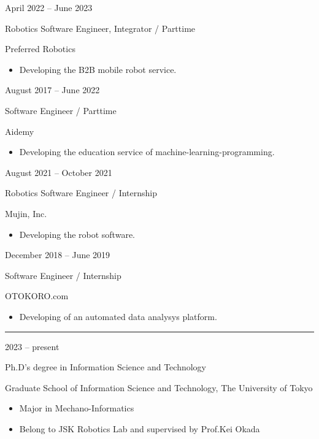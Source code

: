 \documentclass[a4paper,10pt]{article}
\newlength{\cvcolumngapwidth}
\newlength{\cvleftcolumnwidth}
\newlength{\cvrightcolumnwidth}
\newcommand{\cvsectionstyle}[1]{{\normalsize\cvsectionfont\textcolor{cvsectioncolor}{#1}}}
\newcommand{\cvtitlestyle}[1]{{\large\cvtitlefont\textcolor{cvtitlecolor}{#1}}}
\newcommand{\cvdurationstyle}[1]{{\small\cvdurationfont\textcolor{cvdurationcolor}{#1}}}
\newlength{\cvafteritemskipamount}
\newlength{\cvaftersectionskipamount}
\newlength{\cvaftertitleskipamount}
\newlength{\cvparskip}
\newcommand{\cvsection}[1]{
    \begin{minipage}[t]{\cvleftcolumnwidth}
        \raggedleft\cvsectionstyle{#1}
    \end{minipage}%
    \hspace{\cvcolumngapwidth}%
    \begin{minipage}[t]{\cvrightcolumnwidth}
        \textcolor{cvrulecolor}{\rule{\cvrightcolumnwidth}{0.3mm}}
    \end{minipage}

    \vspace{\cvaftersectionskipamount}
}
\newcommand{\cvitem}[2]{
    \begin{minipage}[t]{\cvleftcolumnwidth}
        \raggedleft #1
    \end{minipage}%
    \hspace{\cvcolumngapwidth}%
    \begin{minipage}[t]{\cvrightcolumnwidth}
        \setlength{\parskip}{\cvparskip} #2
    \end{minipage}

    \vspace{\cvafteritemskipamount}
}
\newcommand{\cvtitle}[1]{
    \cvtitlestyle{#1}

    \vspace{\cvaftertitleskipamount}
    \vspace{-\cvparskip}
}
\begin{document}
\cvitem{
  \cvdurationstyle{April 2022 -- June 2023}
}{
  \cvtitle{Robotics Software Engineer, Integrator / Parttime}

  Preferred Robotics

  \begin{itemize}[leftmargin=*]
    \item Developing the B2B mobile robot service.
  \end{itemize}
}

\cvitem{
  \cvdurationstyle{August 2017 -- June 2022}
}{
  \cvtitle{Software Engineer / Parttime}

  Aidemy

  \begin{itemize}[leftmargin=*]
    \item Developing the education service of machine-learning-programming.
  \end{itemize}
}

\cvitem{
  \cvdurationstyle{August 2021 -- October 2021}
}{
  \cvtitle{Robotics Software Engineer / Internship}

  Mujin, Inc.

  \begin{itemize}[leftmargin=*]
    \item Developing the robot software.
  \end{itemize}
}

\cvitem{
  \cvdurationstyle{December 2018 -- June 2019}
}{
  \cvtitle{Software Engineer / Internship}
  OTOKORO.com
  \begin{itemize}[leftmargin=*]
    \item Developing of an automated data analysys platform.
  \end{itemize}
  
}



\cvsection{EDUCATION}

\cvitem{
    \cvdurationstyle{2023 -- present}
}{
    \cvtitle{Ph.D's degree in Information Science and Technology}

    Graduate School of Information Science and Technology, The University of Tokyo

    \begin{itemize}[leftmargin=*]
        \item Major in Mechano-Informatics
        \item Belong to JSK Robotics Lab and supervised by Prof.Kei Okada
    \end{itemize}
}
\end{document}
